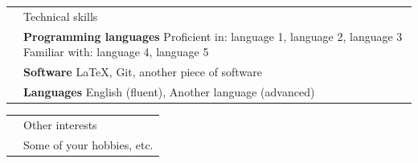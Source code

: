 \documentclass[letterpaper, 11pt]{article}
\newcommand{\headingfont}{\Large\color{OliveGreen}}
\newenvironment{SectionTable}[1]{
	\renewcommand*{\arraystretch}{1.4}
	\setlength{\tabcolsep}{10pt}
	\begin{longtable}{Rp{5.2in}} & #1 \\}
{\end{longtable}\vspace{-.3cm}}
\begin{document}
\begin{SectionTable}{\headingfont Technical skills}
& \textbf{Programming languages} \newline
Proficient in: language 1, language 2, language 3 \newline
Familiar with: language 4, language 5 \\

& \textbf{Software} \newline
\LaTeX, Git, another piece of software \\

& \textbf{Languages} \newline
English (fluent), Another language (advanced)
\end{SectionTable}


\begin{SectionTable}{\headingfont Other interests}
& Some of your hobbies, etc.
\end{SectionTable}

\end{document}
